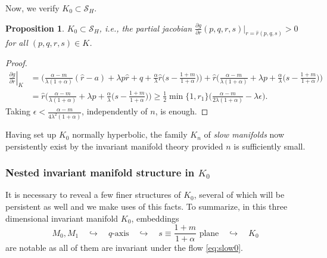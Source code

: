 \documentclass[a4paper,11pt]{article}
\newtheorem{proposition}{Proposition}[section]
\newtheorem{definition}{Definition}[section]
\theoremstyle{remark}
\begin{document}
Now, we verify $K_0\subset \mathcal{S}_H$. %
\begin{proposition}
$K_0\subset \mathcal{S}_H$, i.e., the partial jacobian $\frac{\partial g}{\partial r}(p,q,r,s)|_{r=\hat{r}(p,q,s)} >0 $ for all $(p,q,r,s)\in K$. %
\end{proposition}
\begin{proof}
 \begin{align*}
 \left.\frac{\partial g}{\partial r}\right|_{K} &= \Big(\frac{\alpha-m}{\lambda(1+\alpha)}(\hat{r}-a) + \lambda p\hat{r} + q +\frac{\alpha}{\lambda}\hat{r}\big(s- \frac{1+m}{1+\alpha}\big)\Big) + \hat{r}\Big(\frac{\alpha-m}{\lambda(1+\alpha)} + \lambda p + \frac{\alpha}{\lambda}\big(s- \frac{1+m}{1+\alpha}\big)\Big)\\
 &= \hat{r}\Big(\frac{\alpha-m}{\lambda(1+\alpha)} + \lambda p + \frac{\alpha}{\lambda}\big(s- \frac{1+m}{1+\alpha}\big) \Big)\ge \frac{1}{2}\min\{1,r_1\}\Big(\frac{\alpha-m}{2\lambda(1+\alpha)} - \lambda \epsilon\Big).
 \end{align*}
 Taking $\epsilon < \frac{\alpha-m}{4\lambda^2(1+\alpha)}$, independently of $n$, is enough.
\end{proof}
Having set up $K_0$ normally hyperbolic, the family $K_n$ of {\it slow manifolds} now persistently exist by the invariant manifold theory provided $n$ is sufficiently small.
\subsubsection{Nested invariant manifold structure in $K_0$}
It is necessary to reveal a few finer structures of $K_0$, several of which will be persistent as well and we make uses of this facts. To summarize, in this three dimensional invariant manifold $K_0$, embeddings 
$$ M_0, M_1 \quad \hookrightarrow \quad \text{$q$-axis} \quad \hookrightarrow \quad \text{$s\equiv\frac{1+m}{1+\alpha}$ plane} \quad \hookrightarrow \quad K_0$$
are notable as all of them are invariant under the flow \eqref{eq:slow0}.
\end{document}
